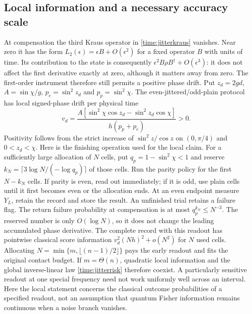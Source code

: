 \documentclass[11pt,a4paper]{article}
\numberwithin{equation}{section}
\theoremstyle{remark}
\begin{document}
\subsection{Local information and a necessary accuracy scale}

At compensation the third Kraus operator in \eqref{time:jitterkraus}
vanishes. Near zero it has the form $L_2(\epsilon)=\epsilon B+O(\epsilon^2)$
for a fixed operator $B$ with units of time. Its contribution to the state is consequently
$\epsilon^2B\rho B^\dagger+O(\epsilon^3)$: it does not affect the first
derivative exactly at zero, although it matters away from zero.
The first-order instrument therefore still
permits a positive phase drift. Put $z_d=2gd$, $A=\sin\chi/g$,
$p_e=\sin^2z_d$ and $p_p=\sin^2\chi$. The even-jittered/odd-plain protocol
has local signed-phase drift per physical time
\begin{equation}
 v_d=\frac{A[\sin^2\chi\cos z_d-\sin^2z_d\cos\chi]}
 {h(p_p+p_e)}>0.
\end{equation}
Positivity follows from the strict increase of $\sin^2z/\cos z$ on
$(0,\pi/4)$ and $0<z_d<\chi$.
Here is the finishing operation used for the local claim. For a sufficiently
large allocation of $N$ cells, put $q_p=1-\sin^2\chi<1$ and reserve
$k_N=\lceil3\log N/(-\log q_p)\rceil$ of those cells. Run the parity policy
for the first $N-k_N$ cells. If parity is even, read out immediately; if it
is odd, use plain cells until it first becomes even or the allocation ends.
At an even endpoint measure $Y_L$, retain the record and store the result.
An unfinished trial retains a failure flag. The return failure probability
at compensation is at most $q_p^{k_N}\le N^{-3}$. The reserved number is only
$O(\log N)$, so it does not change the leading accumulated phase derivative.
The complete record with this readout has pointwise classical score information
$v_d^2(Nh)^2+o(N^2)$ for $N$ used cells. Allocating
$N=\min\{m,\lfloor(n-1)/2\rfloor\}$ pays the early readout and fits the
original contact budget. If $m=\Theta(n)$, quadratic local information and
the global inverse-linear law \eqref{time:jitterrisk} therefore coexist.
A particularly sensitive readout at one special frequency need not work
uniformly well across an interval. Here the local statement concerns the
classical outcome probabilities of a specified readout, not an assumption
that quantum Fisher information remains continuous when a noise branch
vanishes.
\end{document}
